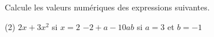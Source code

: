 %
%
Calcule les valeurs numériques des expressions suivantes.
  \begin{tasks} (2)
    \task $2x+3x^2$ si $x=2$
    \task $-2+a-10ab$ si $a=3$ et $b=-1$
  \end{tasks}
